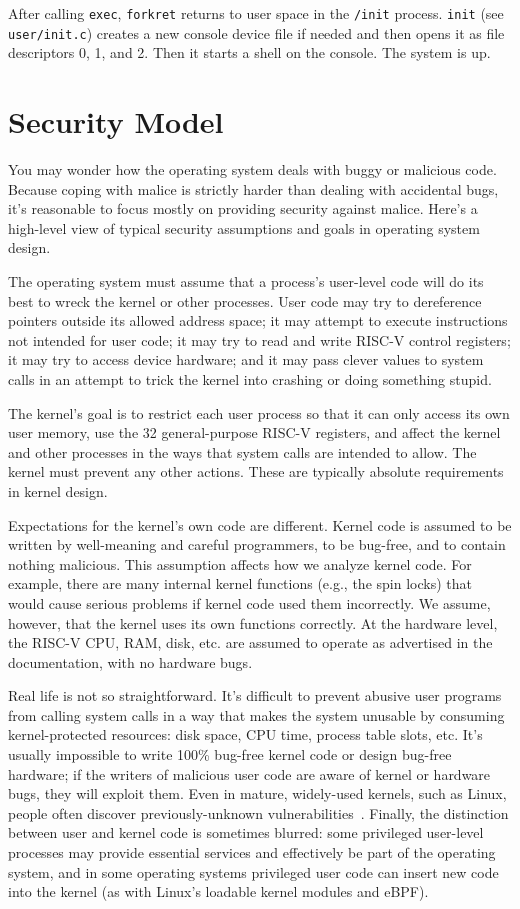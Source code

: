 After calling
\lstinline{exec},
{\tt forkret} returns to user space in
the \lstinline{/init} process.
\lstinline{init}
(see \texttt{user/init.c})
creates a new console device file
if needed
and then opens it as file descriptors 0, 1, and 2.
Then it starts a shell on the console.
The system is up.
\section{Security Model}

You may wonder how the operating system deals with buggy or malicious
code. Because coping with malice is strictly harder than dealing with
accidental bugs, it's reasonable to
focus mostly on providing security against malice.
Here's a high-level view of typical security assumptions and
goals in operating system design.

The operating system must assume that a process's user-level code will
do its best to wreck the kernel or other processes. User code may try
to dereference pointers outside its allowed address space; it may
attempt to execute instructions not intended
for user code; it may try to read and write RISC-V control
registers; it may try to access device hardware;
and it may pass clever values to system calls in an attempt
to trick the kernel into crashing or doing something stupid.

The
kernel's goal is to restrict each user process so that it can only
access its own user memory, use the 32 general-purpose
RISC-V registers, and affect the kernel and other processes in the
ways that system calls are intended to allow. The kernel must prevent
any other actions. These are typically absolute requirements in kernel
design.

Expectations for the kernel's own code are different. Kernel
code is assumed to be written by well-meaning and careful programmers,
to be bug-free, and to contain
nothing malicious. This assumption affects how we analyze kernel code.
For example, there are many internal kernel functions (e.g., the spin
locks) that would cause serious problems if kernel code used them
incorrectly. We assume,
however, that the kernel uses its own functions correctly.
At the hardware level, the RISC-V CPU, RAM, disk, etc. are
assumed to operate as advertised in the documentation, with no
hardware bugs.

Real life is not so straightforward. It's
difficult to prevent abusive user programs from
calling system calls in a way that makes the system unusable
by consuming kernel-protected resources:
disk space, CPU time, process table slots, etc. It's usually
impossible to write 100\% bug-free kernel code or design bug-free hardware; if the
writers of malicious user code are aware of kernel or hardware bugs,
they will exploit them. Even in mature, widely-used kernels, such as
Linux, people often discover previously-unknown
vulnerabilities~\cite{mitre:cves}.
Finally, the distinction between
user and kernel code is sometimes blurred: some privileged user-level
processes may provide essential services and effectively be part of
the operating system, and in some operating systems privileged user
code can insert new code into the kernel (as with Linux's loadable
kernel modules and eBPF).

